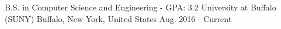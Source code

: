 

\begin{cventries}

  \cventry
    {B.S. in Computer Science and Engineering - GPA: 3.2} %
    {University at Buffalo (SUNY)} %
    {Buffalo, New York, United States} %
    {Aug. 2016 - Current} %
    {
    }
    

\end{cventries}